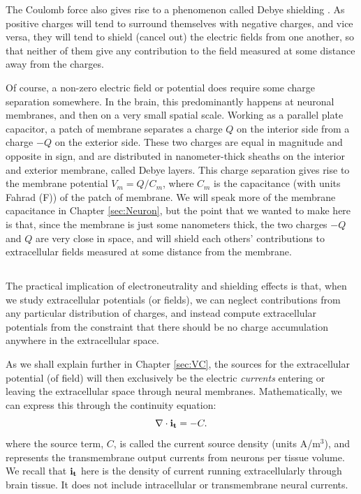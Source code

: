 The Coulomb force also gives rise to a phenomenon called Debye shielding \cite{Nunez2006}. As positive charges will tend to surround themselves with negative charges, and vice versa, they will tend to shield (cancel out) the electric fields from one another, so that neither of them give any contribution to the field measured at some distance away from the charges.

Of course, a non-zero electric field or potential does require some charge separation somewhere. In the brain, this predominantly happens at neuronal membranes, and then on a very small spatial scale. Working as a parallel plate capacitor, a patch of membrane separates a charge $Q$ on the interior side from a charge $-Q$ on the exterior side. These two charges are equal in magnitude and opposite in sign, and are distributed in nanometer-thick sheaths on the interior and exterior membrane, called Debye layers. This charge separation gives rise to the membrane potential $V_m = Q/C_m$, where $C_m$ is the capacitance (with units Fahrad (F)) of the patch of membrane. We will speak more of the membrane capacitance in Chapter \ref{sec:Neuron}, but the point that we wanted to make here is that, since the membrane is just some nanometers thick, the two charges $-Q$ and $Q$ are very close in space, and will shield each others' contributions to extracellular fields measured at some distance from the membrane. 


\subsection{}
\label{sec:Basics:C} 
The practical implication of electroneutrality and shielding effects is that, when we study extracellular potentials (or fields), we can neglect contributions from any particular distribution of charges, and instead compute extracellular potentials from the constraint that there should be no charge accumulation anywhere in the extracellular space. 

As we shall explain further in Chapter \ref{sec:VC}, the sources for the extracellular potential (of field) will then exclusively be the electric \textit{currents} entering or leaving the extracellular space through neural membranes. Mathematically, we can express this through the continuity equation:
\begin{equation}
\nabla \cdot {\bf i_t} = -C.
\label{Basics:eq:continuity1}
\end{equation}
where the source term, $C$, is called the current source density (units A/m$^3$), and represents  
the transmembrane output currents from neurons per tissue volume. We recall that ${\bf i_t}$ here is the density of current running extracellularly through brain tissue. It does not include intracellular or transmembrane neural currents. 

